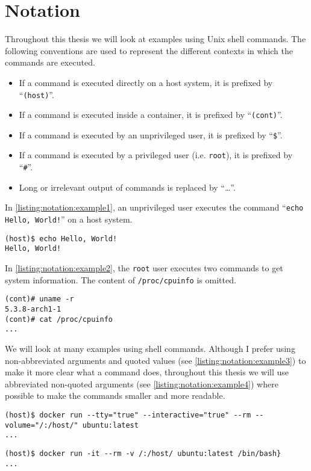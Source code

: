 \chapter{Notation}\label{chapter:notation}
Throughout this thesis we will look at examples using Unix shell commands. The following conventions are used to represent the different contexts in which the commands are executed.

\begin{itemize}
    \item If a command is executed directly on a host system, it is prefixed by ``\lstinline{(host)}''.
    \item If a command is executed inside a container, it is prefixed by ``\lstinline{(cont)}''.
    \item If a command is executed by an unprivileged user, it is prefixed by ``\lstinline{$}''.
    \item If a command is executed by a privileged user (i.e. \lstinline{root}), it is prefixed by ``\lstinline{#}''.
    \item Long or irrelevant output of commands is replaced by ``\ldots''.
\end{itemize}

In \autoref{listing:notation:example1}, an unprivileged user executes the command ``\lstinline{echo Hello, World!}'' on a host system.
\begin{lstlisting}[caption={Shell command notation example 1.}, captionpos=b, label={listing:notation:example1}]
(host)$ echo Hello, World!
Hello, World!
\end{lstlisting}

\hfill

In \autoref{listing:notation:example2}, the \lstinline{root} user executes two commands to get system information. The content of \lstinline{/proc/cpuinfo} is omitted.
\begin{lstlisting}[caption={Shell command notation example 2.}, captionpos=b, label={listing:notation:example2}]
(cont)# uname -r
5.3.8-arch1-1
(cont)# cat /proc/cpuinfo
...
\end{lstlisting}

\hfill

We will look at many examples using shell commands. Although I prefer using non-abbreviated arguments and quoted values (see \autoref{listing:notation:example3}) to make it more clear what a command does, throughout this thesis we will use abbreviated non-quoted arguments (see \autoref{listing:notation:example4}) where possible to make the commands smaller and more readable. 

\begin{lstlisting}[caption={Abbreviated non-quoted command example.}, captionpos=b, label={listing:notation:example3}]
(host)$ docker run --tty="true" --interactive="true" --rm --volume="/:/host/" ubuntu:latest
...
\end{lstlisting}

\begin{lstlisting}[caption={Non-abbreviated quoted command example.}, captionpos=b, label={listing:notation:example4}]
(host)$ docker run -it --rm -v /:/host/ ubuntu:latest /bin/bash}
...
\end{lstlisting}
